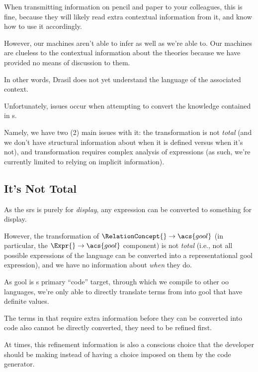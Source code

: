 When transmitting information on pencil and paper to your colleagues, this is
fine, because they will likely read extra contextual information from it, and
know how to use it accordingly.

However, our machines aren't able to infer as well as we're able to. Our
machines are clueless to the contextual information about the theories because
we have provided no means of discussion to them.

In other words, Drasil does not yet understand the language of the associated
context.






Unfortunately, issues occur when attempting to convert the knowledge contained
in \RelationConcept{}s.

Namely, we have two (2) main issues with it: the transformation is not
\textit{total} (and we don't have structural information about when it is
defined versus when it's not), and transformation requires complex analysis of
expressions (as such, we're currently limited to relying on implicit
information).









\subsection{It's Not Total}

As the \acs{srs} is purely for \textit{display}, any \Expr{} expression can be
converted to something for display.

However, the transformation of \(\RelationConcept{} \rightarrow \acs{gool}\) (in
particular, the \(\Expr{} \rightarrow \acs{gool}\) component) is not
\textit{total} (i.e., not all possible expressions of the \Expr{} language can
be converted into a representational \acs{gool} expression), and we have no
information about \textit{when} they do.

As \acs{gool} is \Expr{}s primary ``code'' target, through which we compile to
other \acs{oo} languages, we're only able to directly translate terms from
\Expr{} into \acs{gool} that have definite values.

The terms in \Expr{} that require extra information before they can be converted
into code also cannot be directly converted, they need to be refined first.

At times, this refinement information is also a conscious choice that the
developer should be making instead of having a choice imposed on them by the
code generator.









